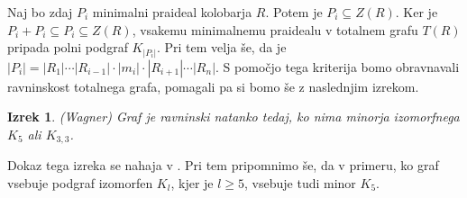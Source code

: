 \documentclass[a4paper, 12pt]{amsart}
\theoremstyle{definition} %
\theoremstyle{plain} %
\newtheorem{izrek}[definicija]{Izrek}
\begin{document}
Naj bo zdaj $P_i$ minimalni praideal kolobarja $R$. Potem je $P_i \subseteq Z(R)$. Ker je $P_i + P_i \subseteq P_i \subseteq Z(R)$, vsakemu minimalnemu praidealu v totalnem grafu $T(R)$ pripada polni podgraf $K_{|P_i|}$. Pri tem velja še, da je $|P_i| = |R_1|\cdots |R_{i-1}| \cdot |m_i| \cdot |R_{i+1}| \cdots |R_n|$.
S pomočjo tega kriterija bomo obravnavali ravninskost totalnega grafa, pomagali pa si bomo še z naslednjim izrekom.

\begin{izrek}(Wagner)
Graf je ravninski natanko tedaj, ko nima minorja izomorfnega $K_5$ ali $K_{3,3}$.
\end{izrek}
Dokaz tega izreka se nahaja v \cite[Theorem 4.2.9]{Diestel}. Pri tem pripomnimo še, da v primeru, ko graf vsebuje podgraf izomorfen $K_l$, kjer je $l\ge5$, vsebuje tudi minor $K_5$.
\end{document}
